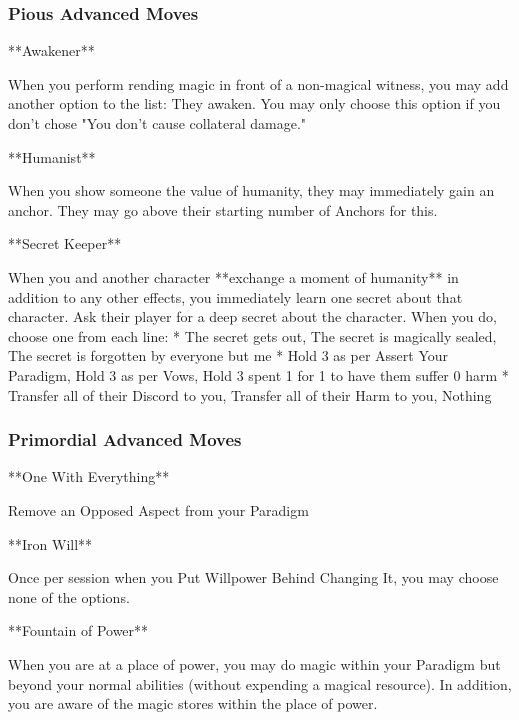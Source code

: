 \documentclass[
  oneside,
  statementpaper,
  9pt]{memoir}
\begin{document}
\hypertarget{pious-advanced-moves}{%
\subsubsection{Pious Advanced Moves}\label{pious-advanced-moves}}

\begin{Player}

**Awakener**

When you perform rending magic in front of a non-magical witness, you may add another option to the list: They awaken. You may only choose this option if you don’t chose "You don’t cause collateral damage."

**Humanist**

When you show someone the value of humanity, they may immediately gain an anchor. They may go above their starting number of Anchors for this.

**Secret Keeper**

When you and another character **exchange a moment of humanity** in addition to any other effects, you immediately learn one secret about that character. Ask their player for a deep secret about the character. When you do, choose one from each line:
* The secret gets out, The secret is magically sealed, The secret is forgotten by everyone but me  
* Hold 3 as per Assert Your Paradigm, Hold 3 as per Vows, Hold 3 spent 1 for 1 to have them suffer 0 harm  
* Transfer all of their Discord to you, Transfer all of their Harm to you, Nothing

\end{Player}

\hypertarget{primordial-advanced-moves}{%
\subsubsection{Primordial Advanced
Moves}\label{primordial-advanced-moves}}

\begin{Player}

**One With Everything**

Remove an Opposed Aspect from your Paradigm

**Iron Will**

Once per session when you Put Willpower Behind Changing It, you may choose none of the options.

**Fountain of Power**

When you are at a place of power, you may do magic within your Paradigm but beyond your normal abilities (without expending a magical resource). In addition, you are aware of the magic stores within the place of power.

\end{Player}
\end{document}
